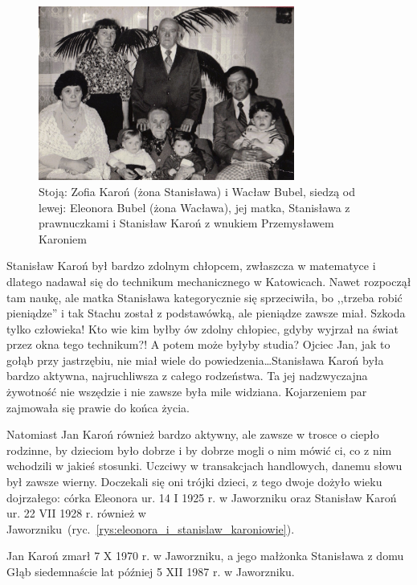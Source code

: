 \begin{figure}
\begin{center}
\includegraphics[width=0.75\textwidth]{zdjecia/eleonora_i_waclaw_bublowie.jpg}
\caption[Eleonora i Wacław Bublowie]{Stoją: Zofia Karoń (żona Stanisława) i Wacław Bubel, siedzą od lewej: Eleonora Bubel (żona Wacława), jej matka, Stanisława z prawnuczkami i Stanisław Karoń z wnukiem Przemysławem Karoniem}
\label{rys:eleonora_i_waclaw_bublowie}
\end{center}
\end{figure}
Stanisław Karoń był bardzo zdolnym chłopcem, zwłaszcza w matematyce i dlatego nadawał się do technikum mechanicznego w Katowicach. Nawet rozpoczął tam naukę, ale matka Stanisława kategorycznie się sprzeciwiła, bo ,,trzeba robić pieniądze'' i tak Stachu został z podstawówką, ale pieniądze zawsze miał. Szkoda tylko człowieka! Kto wie kim byłby ów zdolny chłopiec, gdyby wyjrzał na świat przez okna tego technikum?! A potem może byłyby studia? Ojciec Jan, jak to gołąb przy jastrzębiu, nie miał wiele do powiedzenia\ldots Stanisława Karoń była bardzo aktywna, najruchliwsza z całego rodzeństwa. Ta jej nadzwyczajna żywotność nie wszędzie i nie zawsze była mile widziana. Kojarzeniem par zajmowała się prawie do końca życia.

Natomiast Jan Karoń również bardzo aktywny, ale zawsze w trosce o ciepło rodzinne, by dzieciom było dobrze i by dobrze mogli o nim mówić ci, co z nim wchodzili w jakieś stosunki. Uczciwy w transakcjach handlowych, danemu słowu był zawsze wierny. Doczekali się oni trójki dzieci, z tego dwoje dożyło wieku dojrzałego: córka Eleonora ur. 14 I 1925 r. w Jaworzniku oraz Stanisław Karoń ur. 22 VII 1928 r. również w Jaworzniku~(ryc.~\ref{rys:eleonora_i_stanislaw_karoniowie}).

Jan Karoń zmarł 7 X 1970 r. w Jaworzniku, a jego małżonka Stanisława z domu Głąb siedemnaście lat później 5 XII 1987 r. w Jaworzniku.



